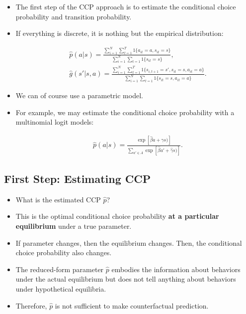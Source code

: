 \documentclass[]{book}
\providecommand{\tightlist}{%
  \setlength{\itemsep}{0pt}\setlength{\parskip}{0pt}}
\begin{document}
\begin{itemize}
\tightlist
\item
  The first step of the CCP approach is to estimate the conditional
  choice probability and transition probability.
\item
  If everything is discrete, it is nothing but the empirical
  distribution:

  \begin{equation}
  \begin{split}
  &\hat{p}(a|s) = \frac{\sum_{i = 1}^N \sum_{t = 1}^T 1\{a_{it} = a, s_{it} = s\}}{\sum_{i = 1}^N \sum_{t = 1} 1\{s_{it} = s\}},\\
  &\hat{g}(s'|s, a) = \frac{\sum_{i = 1}^N \sum_{t = 1}^T 1\{s_{i, t + 1} = s', s_{it} = s, a_{it} = a\}}{\sum_{i = 1}^N \sum_{t = 1} 1\{s_{it} = s, a_{it} = a\}}.
  \end{split}
  \end{equation}
\item
  We can of course use a parametric model.
\item
  For example, we may estimate the conditional choice probability with a
  multinomial logit models:

  \begin{equation}
  \begin{split}
  &\hat{p}(a|s) = \frac{\exp[\hat{\beta} a + \hat{\gamma} s)]}{\sum_{a' \in A} \exp[\hat{\beta} a' + \hat{\gamma} s)]}.
  \end{split}
  \end{equation}
\end{itemize}

\subsection{First Step: Estimating
CCP}\label{first-step-estimating-ccp-1}

\begin{itemize}
\tightlist
\item
  What is the estimated CCP \(\hat{p}\)?
\item
  This is the optimal conditional choice probability \textbf{at a
  particular equilibrium} under a true parameter.
\item
  If parameter changes, then the equilibrium changes. Then, the
  conditional choice probability also changes.
\item
  The reduced-form parameter \(\hat{p}\) embodies the information about
  behaviors under the actual equilibrium but does not tell anything
  about behaviors under hypothetical equilibria.
\item
  Therefore, \(\hat{p}\) is not sufficient to make counterfactual
  prediction.
\end{itemize}
\end{document}

